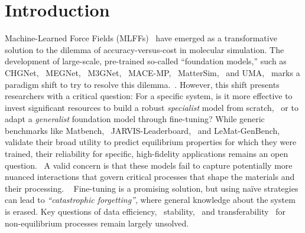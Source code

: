 \documentclass[pdflatex,sn-mathphys-num]{sn-jnl}%
\theoremstyle{thmstyleone}%
\theoremstyle{thmstyletwo}%
\theoremstyle{thmstylethree}%
\begin{document}
\section{Introduction}

Machine-Learned Force Fields (MLFFs)~\citep{unke_machine_2021, ssmith_ani-1_2017, chen_accurate_2017, batatia_mace_nodate,vandermause_active_2022, batzner_e3-equivariant_2022, bartok_gaussian_2010, friederich2021machine, zeng_deepmd-kit_2023, wines_chips-ff_2025, musaelian_learning_2023, chen_universal_2022, lindsey2017chimes,  xie2018crystal} have emerged as a transformative solution to the dilemma of accuracy-versus-cost in molecular simulation. The development of large-scale, pre-trained so-called ``foundation models,'' such as CHGNet,~\citep{deng_chgnet_2023} MEGNet,~\citep{chen_graph_2019} M3GNet,~\citep{chen_universal_2022} MACE-MP,~\citep{batatia_mace_nodate} MatterSim,~\citep{yang_mattersim_2024} and UMA,~\citep{wood_uma_2025} marks a paradigm shift to try to resolve this dilemma.~\citep{merchant_scaling_2023}.
However, this shift presents researchers with a critical question: For a specific system, is it more effective to invest significant resources to build a robust \textit{specialist} model from scratch,~\citep{zhang_deep_2018, smith_approaching_2017, chmiela_sgdml_2017} or to adapt a \textit{generalist} foundation model through fine-tuning? While generic benchmarks like Matbench,~\citep{dunn_benchmarking_2020} JARVIS-Leaderboard,~\citep{choudhary2024jarvis} and LeMat-GenBench,~\citep{betala2025lemat} validate their broad utility to predict equilibrium properties for which they were trained, 
their reliability for specific, high-fidelity applications remains an open question.~\citep{friederich_machine-learned_2021, deringer_machine_2019, jacobs2025practical}  
A valid concern is that these models fail to capture potentially more nuanced interactions that govern critical processes that shape the materials and their processing. ~\citep{schran_machine_2020, kapil_assessment_2022, grisafi_transferable_2018, liu2023discrepancies} 
Fine-tuning is a promising solution, but using naïve strategies can lead to \textit{``catastrophic forgetting''}, where general knowledge about the system is erased. Key questions of data efficiency,~\citep{janet_designing_2019, lookman_active_2019} stability,~\citep{zuo_performance_2020, jinnouchi_phase_2020} and transferability~\citep{zeni_data_2021, vandermause_on--fly_2020} for non-equilibrium processes remain largely unsolved. ~\citep{bernstein_quantifying_2019, zhang_active_2019, he2018statistical}
\end{document}
